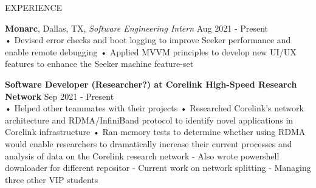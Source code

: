 \documentclass{resume} %
\begin{document}
\begin{rSection}{EXPERIENCE}

\textbf{\bf Monarc}, Dallas, TX, {\emph{Software Engineering Intern}} \hfill Aug 2021 - Present\\
• Devised error checks and boot logging to improve Seeker performance and enable remote debugging \newline
• Applied MVVM principles to develop new UI/UX features to enhance the Seeker machine feature-set \smallskip

\textbf{\bf Software Developer (Researcher?) at Corelink High-Speed Research Network} \hfill Sep 2021 - Present \\%
• Helped other teammates with their projects 
• Researched Corelink’s network architecture and RDMA/InfiniBand protocol to identify novel applications in Corelink infrastructure \newline
• Ran memory tests to determine whether using RDMA would enable researchers to dramatically increase their current processes and analysis of data on the Corelink research network
- Also wrote powershell downloader for different repositor
- Current work on network splitting 
- Managing three other VIP students

\end{rSection} 
\end{document}
